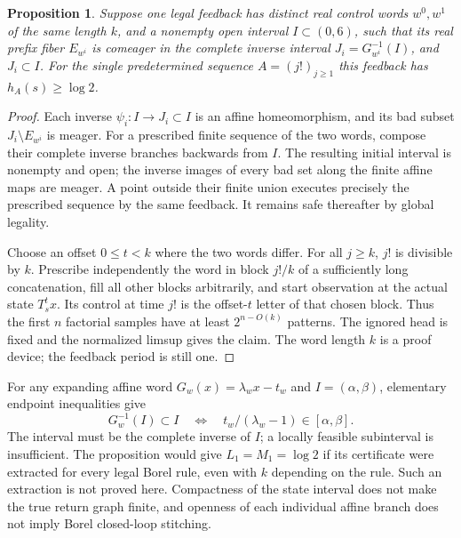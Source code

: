 \documentclass[11pt,reqno]{amsart}
\numberwithin{equation}{section}
\newtheorem{proposition}[theorem]{Proposition}
\theoremstyle{definition}
\begin{document}
\begin{proposition}\label{prop:return-certificate}
Suppose one legal feedback has distinct real control words $w^0,w^1$
of the same length $k$, and a nonempty open interval $I\subset(0,6)$,
such that its real prefix fiber $E_{w^i}$ is comeager in the complete
inverse interval $J_i=G_{w^i}^{-1}(I)$, and $J_i\subset I$.
For the single predetermined sequence $A=(j!)_{j\ge1}$ this
feedback has $h_A(s)\ge\log2$.
\end{proposition}
\begin{proof}
Each inverse $\psi_i:I\to J_i\subset I$ is an affine
homeomorphism, and its bad subset $J_i\setminus E_{w^i}$ is
meager. For a prescribed finite sequence of the two words, compose
their complete inverse branches backwards from $I$. The resulting
initial interval is nonempty and open; the inverse images of every
bad set along the finite affine maps are meager. A point outside
their finite union executes precisely the prescribed sequence by
the same feedback. It remains safe thereafter by global legality.

Choose an offset $0\le t<k$ where the two words differ. For
all $j\ge k$, $j!$ is divisible by $k$. Prescribe independently
the word in block $j!/k$ of a sufficiently long concatenation,
fill all other blocks arbitrarily, and start observation at the
actual state $T_s^t x$. Its control at time $j!$ is the offset-$t$
letter of that chosen block. Thus the first $n$ factorial samples
have at least $2^{n-O(k)}$ patterns. The ignored head is fixed
and the normalized limsup gives the claim. The word length $k$
is a proof device; the feedback period is still one.
\end{proof}

For any expanding affine word $G_w(x)=\lambda_w x-t_w$ and
$I=(\alpha,\beta)$, elementary endpoint inequalities give
\[
 G_w^{-1}(I)\subset I
 \quad\Longleftrightarrow\quad
 t_w/(\lambda_w-1)\in[\alpha,\beta].
\]
The interval must be the complete inverse of $I$; a locally feasible
subinterval is insufficient. The proposition would give
$L_1=M_1=\log2$ if its certificate were extracted for every
legal Borel rule, even with $k$ depending on the rule. Such an
extraction is not proved here. Compactness of the state interval
does not make the true return graph finite, and openness of each
individual affine branch does not imply Borel closed-loop stitching.
\end{document}
